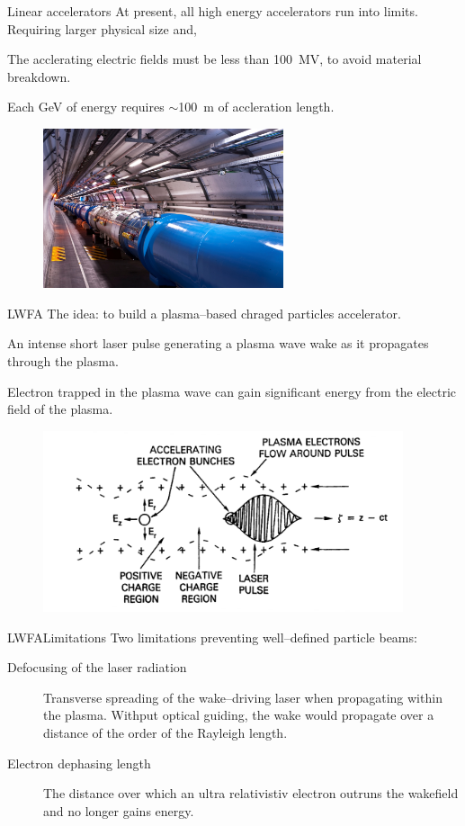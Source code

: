 \documentclass[final]{beamer}
\begin{document}
  \begin{frame}{Linear accelerators}
    At present, all high energy accelerators run into limits.
    Requiring larger physical size and,

    The acclerating electric fields must be less than \SI{100}{\mega \V}, to avoid material breakdown.

    Each \si{\giga \eV} of energy requires $\sim$\SI{100}{\meter} of accleration length.
    \begin{figure}
      \includegraphics[width=200pt]{figures/lhc_cern_compressed.jpg}
    \end{figure}
  \end{frame}
  \begin{frame}{LWFA}
  The idea: to build a plasma--based chraged particles accelerator.

  An intense short laser pulse generating a plasma wave wake as it propagates through the plasma.

  Electron trapped in the plasma wave can gain significant energy from the electric field of the plasma.
  \begin{figure}
    \includegraphics[width=300pt]{figures/lwfa-schematic.PNG}
  \end{figure}
  \end{frame}
  \begin{frame}{LWFA}{Limitations}
    Two limitations preventing well--defined particle beams:
    \begin{description}
      \item[Defocusing of the laser radiation] Transverse spreading of the wake--driving laser when propagating within the plasma. Withput optical guiding, the wake would propagate over a distance of the order of the Rayleigh length.
      \item[Electron dephasing length] The distance over which an ultra relativistiv electron outruns the wakefield and no longer gains energy.
    \end{description}
  \end{frame}
\end{document}
